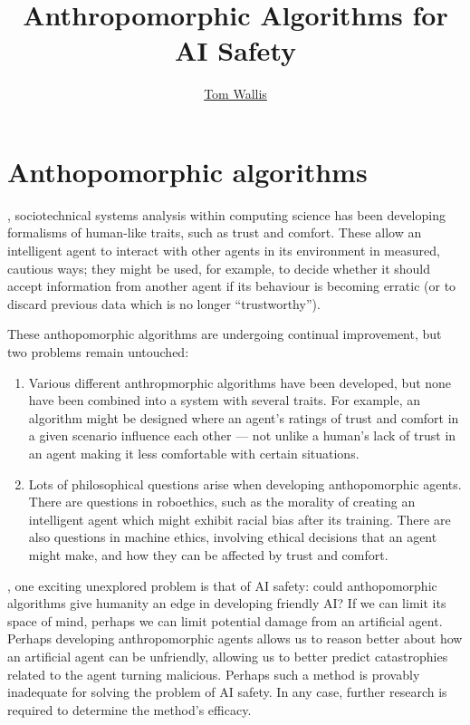 
\title{Anthropomorphic Algorithms for AI Safety}
\author[Tom Wallis]{\href{http://tom.coffee}{Tom Wallis}}
\date{}



\maketitle

\section{Anthopomorphic algorithms}
, sociotechnical systems analysis within computing science has been developing formalisms of human-like traits, such as trust and comfort. These allow an intelligent agent to interact with other agents in its environment in measured, cautious ways; they might be used, for example, to decide whether it should accept information from another agent if its behaviour is becoming erratic (or to discard previous data which is no longer ``trustworthy''). \par

These anthopomorphic algorithms are undergoing continual improvement\cite{Kramdi}\cite{Urbano2014}, but two problems remain untouched:
\begin{enumerate}
    \item Various different anthropmorphic algorithms have been developed, but none have been combined into a system with several traits. {\newline}For example, an algorithm might be designed where an agent's ratings of trust and comfort in a given scenario influence each other --- not unlike a human's lack of trust in an agent making it less comfortable with certain situations.
    \item Lots of philosophical questions arise when developing anthopomorphic agents. There are questions in roboethics, such as the morality of creating an intelligent agent which might exhibit racial bias after its training. There are also questions in machine ethics, involving ethical decisions that an agent might make, and how they can be affected by trust and comfort.
\end{enumerate}

\bigskip
{}, one exciting unexplored problem is that of AI safety: could anthopomorphic algorithms give humanity an edge in developing friendly AI\@? If we can limit its space of mind\cite{shanahan, sloman_spaceofminds}, perhaps we can limit potential damage from an artificial agent. Perhaps developing anthropomorphic agents allows us to reason better about how an artificial agent can be unfriendly, allowing us to better predict catastrophies related to the agent turning malicious. Perhaps such a method is provably inadequate for solving the problem of AI safety. In any case, further research is required to determine the method's efficacy.\par

